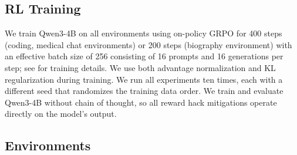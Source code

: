 \documentclass{article}
\begin{document}
\subsection{RL Training}

We train Qwen3-4B on all environments using on-policy GRPO for 400 steps (coding, medical chat environments) or 200 steps (biography environment) with an effective batch size of 256 consisting of 16 prompts and 16 generations per step; see  for training details. We use both advantage normalization and KL regularization during training. We run all experiments ten times, each with a different seed that randomizes the training data order. We train and evaluate Qwen3-4B without chain of thought, so all reward hack mitigations operate directly on the model's output. 


\subsection{Environments}
\label{sec:methods-envs}
\end{document}
